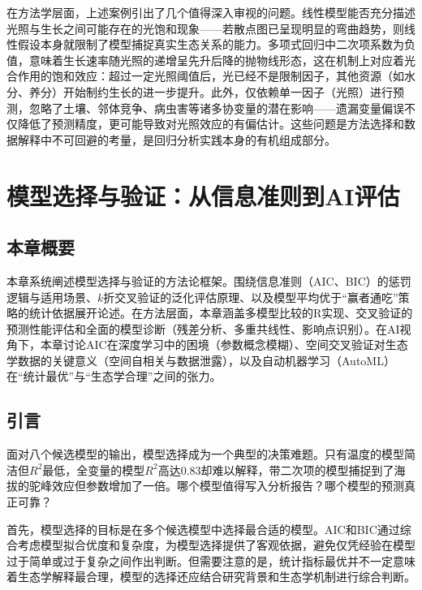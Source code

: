 \documentclass[
  twoside,12pt,fontset=none]{ctexbook}
\begin{document}
在方法学层面，上述案例引出了几个值得深入审视的问题。线性模型能否充分描述光照与生长之间可能存在的光饱和现象------若散点图已呈现明显的弯曲趋势，则线性假设本身就限制了模型捕捉真实生态关系的能力。多项式回归中二次项系数为负值，意味着生长速率随光照的递增呈先升后降的抛物线形态，这在机制上对应着光合作用的饱和效应：超过一定光照阈值后，光已经不是限制因子，其他资源（如水分、养分）开始制约生长的进一步提升。此外，仅依赖单一因子（光照）进行预测，忽略了土壤、邻体竞争、病虫害等诸多协变量的潜在影响------遗漏变量偏误不仅降低了预测精度，更可能导致对光照效应的有偏估计。这些问题是方法选择和数据解释中不可回避的考量，是回归分析实践本身的有机组成部分。

\hypertarget{ch09}{%
\chapter{模型选择与验证：从信息准则到AI评估}\label{ch09}}

\hypertarget{ux672cux7ae0ux6982ux8981-7}{%
\section{本章概要}\label{ux672cux7ae0ux6982ux8981-7}}

本章系统阐述模型选择与验证的方法论框架。围绕信息准则（AIC、BIC）的惩罚逻辑与适用场景、\(k\)折交叉验证的泛化评估原理、以及模型平均优于``赢者通吃''策略的统计依据展开论述。在方法层面，本章涵盖多模型比较的R实现、交叉验证的预测性能评估和全面的模型诊断（残差分析、多重共线性、影响点识别）。在AI视角下，本章讨论AIC在深度学习中的困境（参数概念模糊）、空间交叉验证对生态学数据的关键意义（空间自相关与数据泄露），以及自动机器学习（AutoML）在``统计最优''与``生态学合理''之间的张力。

\hypertarget{ux5f15ux8a00-7}{%
\section{引言}\label{ux5f15ux8a00-7}}

面对八个候选模型的输出，模型选择成为一个典型的决策难题。只有温度的模型简洁但\(R^2\)最低，全变量的模型\(R^2\)高达0.83却难以解释，带二次项的模型捕捉到了海拔的驼峰效应但参数增加了一倍。哪个模型值得写入分析报告？哪个模型的预测真正可靠？

首先，模型选择的目标是在多个候选模型中选择最合适的模型。AIC和BIC通过综合考虑模型拟合优度和复杂度，为模型选择提供了客观依据，避免仅凭经验在模型过于简单或过于复杂之间作出判断。但需要注意的是，统计指标最优并不一定意味着生态学解释最合理，模型的选择还应结合研究背景和生态学机制进行综合判断。
\end{document}
